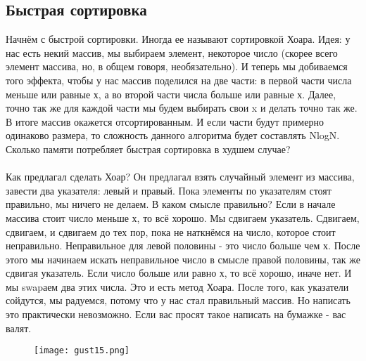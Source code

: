 \documentclass[a4paper,12pt]{article}
\begin{document}
\subsection{Быстрая сортировка}
Начнём с быстрой сортировки. Иногда ее называют сортировкой Хоара. Идея: у нас есть некий массив, мы выбираем элемент, некоторое число (скорее всего элемент массива, но, в общем говоря, необязательно). И теперь мы добиваемся того эффекта, чтобы у нас массив поделился на две части: в первой части числа меньше или равные х, а во второй части числа больше или равные х. Далее, точно так же для каждой части мы будем выбирать свои x и делать точно так же. В итоге массив окажется отсортированным. И если части будут примерно одинаково размера, то сложность данного алгоритма будет составлять NlogN. Сколько памяти потребляет быстрая сортировка в худшем случае?  \\  \\
Как предлагал сделать Хоар? Он предлагал взять случайный элемент из массива, завести два указателя: левый и правый. Пока элементы по указателям стоят правильно, мы ничего не делаем. В каком смысле правильно? Если в начале массива стоит число меньше х, то всё хорошо. Мы сдвигаем указатель. Сдвигаем, сдвигаем, и сдвигаем до тех пор, пока не наткнёмся на число, которое стоит неправильно. Неправильное для левой половины - это число больше чем х. После этого мы начинаем искать неправильное число в смысле правой половины, так же сдвигая указатель. Если число больше или равно х, то всё хорошо, иначе нет. И мы swapаем два этих числа. Это и есть метод Хоара. После того, как указатели сойдутся, мы радуемся, потому что у нас стал правильный массив. Но написать это практически невозможно. Если вас просят такое написать на бумажке - вас валят. \\
\begin{figure}[h]
\centering
\texttt{[image: gust15.png]}
\end{figure}
\end{document}
